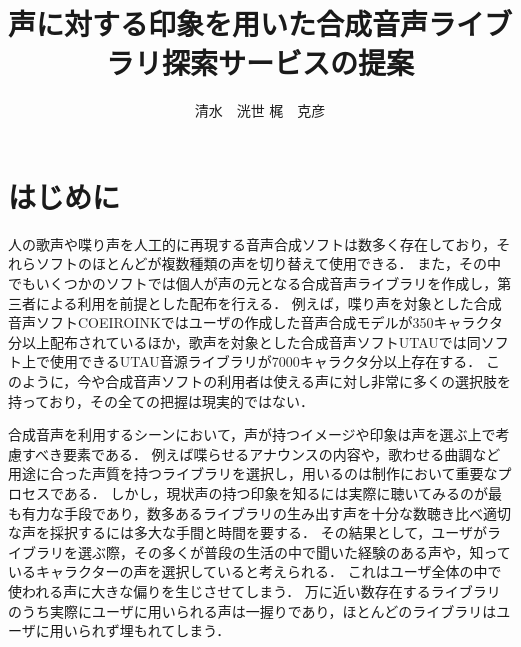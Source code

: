 \documentclass[a4j,8pt,twocolumn]{extarticle}
\title{声に対する印象を用いた合成音声ライブラリ探索サービスの提案}
\author{清水　洸世 \qquad 梶　克彦}
\affiliation{愛知工業大学}
\begin{document}
\maketitle
\thispagestyle{empty}	%

\section{はじめに}

人の歌声や喋り声を人工的に再現する音声合成ソフトは数多く存在しており，それらソフトのほとんどが複数種類の声を切り替えて使用できる．
また，その中でもいくつかのソフトでは個人が声の元となる合成音声ライブラリを作成し，第三者による利用を前提とした配布を行える．
例えば，喋り声を対象とした合成音声ソフトCOEIROINKではユーザの作成した音声合成モデルが350キャラクタ分以上配布されているほか\cite{mycoeiroink}，歌声を対象とした合成音声ソフトUTAUでは同ソフト上で使用できるUTAU音源ライブラリが7000キャラクタ分以上存在する\cite{vdbutau}．
このように，今や合成音声ソフトの利用者は使える声に対し非常に多くの選択肢を持っており，その全ての把握は現実的ではない．

合成音声を利用するシーンにおいて，声が持つイメージや印象は声を選ぶ上で考慮すべき要素である．
例えば喋らせるアナウンスの内容や，歌わせる曲調など用途に合った声質を持つライブラリを選択し，用いるのは制作において重要なプロセスである．
しかし，現状声の持つ印象を知るには実際に聴いてみるのが最も有力な手段であり，数多あるライブラリの生み出す声を十分な数聴き比べ適切な声を採択するには多大な手間と時間を要する．
その結果として，ユーザがライブラリを選ぶ際，その多くが普段の生活の中で聞いた経験のある声や，知っているキャラクターの声を選択していると考えられる．
これはユーザ全体の中で使われる声に大きな偏りを生じさせてしまう．
万に近い数存在するライブラリのうち実際にユーザに用いられる声は一握りであり，ほとんどのライブラリはユーザに用いられず埋もれてしまう．
\end{document}
